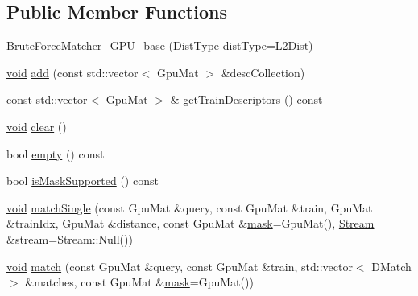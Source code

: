\subsection*{Public Member Functions}
\begin{DoxyCompactItemize}
\item 
\hyperlink{classcv_1_1gpu_1_1BruteForceMatcher__GPU__base_a090cdbbb2a908aa78e85ed5b539c1c9e}{Brute\-Force\-Matcher\-\_\-\-G\-P\-U\-\_\-base} (\hyperlink{classcv_1_1gpu_1_1BruteForceMatcher__GPU__base_aed33fcc2dc26fe578648b63d1726b825}{Dist\-Type} \hyperlink{classcv_1_1gpu_1_1BruteForceMatcher__GPU__base_ab7c62ac82124e7910cd3f8529053ecdb}{dist\-Type}=\hyperlink{classcv_1_1gpu_1_1BruteForceMatcher__GPU__base_aed33fcc2dc26fe578648b63d1726b825a3a3b09b7d87b4c338bff7807249a14cd}{L2\-Dist})
\item 
\hyperlink{legacy_8hpp_a8bb47f092d473522721002c86c13b94e}{void} \hyperlink{classcv_1_1gpu_1_1BruteForceMatcher__GPU__base_a5f5eebaf4031c34b08b933ea5a3fbdfb}{add} (const std\-::vector$<$ Gpu\-Mat $>$ \&desc\-Collection)
\item 
const std\-::vector$<$ Gpu\-Mat $>$ \& \hyperlink{classcv_1_1gpu_1_1BruteForceMatcher__GPU__base_a7e55227f9056f521b79171716931cc24}{get\-Train\-Descriptors} () const 
\item 
\hyperlink{legacy_8hpp_a8bb47f092d473522721002c86c13b94e}{void} \hyperlink{classcv_1_1gpu_1_1BruteForceMatcher__GPU__base_ae22a84c3b0c034cbb980492ab8de7eef}{clear} ()
\item 
bool \hyperlink{classcv_1_1gpu_1_1BruteForceMatcher__GPU__base_a093b71d478d8dbafce4ab712f970a411}{empty} () const 
\item 
bool \hyperlink{classcv_1_1gpu_1_1BruteForceMatcher__GPU__base_a80a8fbe9b885a44f29922a91d8ff8836}{is\-Mask\-Supported} () const 
\item 
\hyperlink{legacy_8hpp_a8bb47f092d473522721002c86c13b94e}{void} \hyperlink{classcv_1_1gpu_1_1BruteForceMatcher__GPU__base_a23d6c5abda4481cec1eea097c07551b4}{match\-Single} (const Gpu\-Mat \&query, const Gpu\-Mat \&train, Gpu\-Mat \&train\-Idx, Gpu\-Mat \&distance, const Gpu\-Mat \&\hyperlink{tracking_8hpp_a6b13ecd2fd6ec7ad422f1d7863c3ad19}{mask}=Gpu\-Mat(), \hyperlink{classcv_1_1gpu_1_1Stream}{Stream} \&stream=\hyperlink{classcv_1_1gpu_1_1Stream_af96c23564834f88333dcb8997df553f1}{Stream\-::\-Null}())
\item 
\hyperlink{legacy_8hpp_a8bb47f092d473522721002c86c13b94e}{void} \hyperlink{classcv_1_1gpu_1_1BruteForceMatcher__GPU__base_a0847f149672701196de9665096150ab3}{match} (const Gpu\-Mat \&query, const Gpu\-Mat \&train, std\-::vector$<$ D\-Match $>$ \&matches, const Gpu\-Mat \&\hyperlink{tracking_8hpp_a6b13ecd2fd6ec7ad422f1d7863c3ad19}{mask}=Gpu\-Mat())

\end{DoxyCompactItemize}

